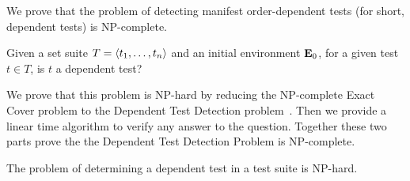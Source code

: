 We prove that the problem of detecting manifest order-dependent tests (for
short, dependent tests) is NP-complete.


\begin{definition}
Given a set suite\/ $T =  \langle t_1, \dots, t_n \rangle $ and an initial environment\/
$\mathbf{E}_0$, for a given test\/ $t \in T$, is $t$ a dependent test?
\end{definition}

We prove that this problem is NP-hard by reducing the NP-complete Exact Cover problem
to the Dependent Test Detection
problem~\cite{karp:NP:1972}. 
Then we provide a linear time algorithm to verify any answer to the
question.
Together these two parts prove the the Dependent Test Detection Problem is NP-complete.

\begin{theorem}
The problem of determining a dependent test in
a test suite is NP-hard.
\end{theorem}

